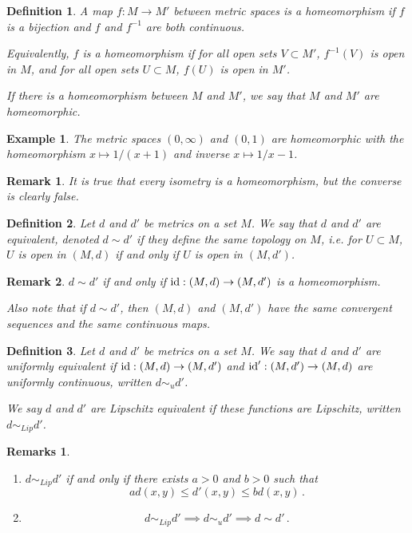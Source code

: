 \documentclass{article}
\theoremstyle{plain}\theoremheaderfont{\normalfont\itshape}\theorembodyfont{\rmfamily}\theoremseparator{.}\newtheorem*{rem}{Remark}\newtheorem*{ex}{Example}\newtheorem*{proof}{Proof}\newtheorem*{altp}{Alternative proof}
\theoremstyle{plain}\theoremheaderfont{\normalfont\bfseries}\theorembodyfont{\rmfamily}\theoremseparator{.}\newtheorem{thm}{Theorem}[section]\newtheorem{lem}[thm]{Lemma}\newtheorem{prop}[thm]{Proposition}\newtheorem*{cor}{Corollary}\newtheorem{defn}[thm]{Definition}\newtheorem{clm}[thm]{Claim}\newtheorem{clminproof}{Claim}
\theoremstyle{break}\theoremheaderfont{\normalfont\itshape}\theorembodyfont{\rmfamily}\theoremseparator{.\medskip}\newtheorem*{proofskip}{Proof}\newtheorem*{exs}{Examples}\newtheorem*{rems}{Remarks}
\theoremstyle{break}\theoremheaderfont{\normalfont\bfseries}\theorembodyfont{\rmfamily}\theoremseparator{.\medskip}\newtheorem{lemskip}[thm]{Lemma}\newtheorem{defnskip}[thm]{Definition}\newtheorem{propskip}[thm]{Proposition}\newtheorem{thmskip}[thm]{Theorem}
\DeclareMathOperator{\id}{id}
\begin{document}
    \begin{defn}
        A map \(f:M\to M'\) between metric spaces is a \textit{homeomorphism} if \(f\) is a bijection and \(f\) and \(f^{-1}\) are both continuous.

        Equivalently, \(f\) is a \textit{homeomorphism} if for all open sets \(V\subset M'\), \(f^{-1}(V)\) is open in \(M\), and for all open sets \(U\subset M\), \(f(U)\) is open in \(M'\).

        If there is a homeomorphism between \(M\) and \(M'\), we say that \(M\) and \(M'\) are \textit{homeomorphic}.
    \end{defn}

    \begin{ex}
        The metric spaces \((0,\infty)\) and \((0,1)\) are homeomorphic with the homeomorphism \(x\mapsto 1/(x+1)\) and inverse \(x\mapsto 1/x -1\).
    \end{ex}
    \begin{rem}
        It is true that every isometry is a homeomorphism, but the converse is clearly false.
    \end{rem}

    \begin{defn}
        Let \(d\) and \(d'\) be metrics on a set \(M\). We say that \(d\) and \(d'\) are \textit{equivalent}, denoted \(d\sim d'\) if they define the same topology on \(M\), i.e. for \(U\subset M\), \(U\) is open in \((M,d)\) if and only if \(U\) is open in \((M,d')\).
    \end{defn}
    \begin{rem}
        \(d\sim d'\) if and only if \(\id:(M,d)\to(M,d')\) is a homeomorphism.

        Also note that if \(d\sim d'\), then \((M,d)\) and \((M,d')\) have the same convergent sequences and the same continuous maps.
    \end{rem}

    \begin{defn}
        Let \(d\) and \(d'\) be metrics on a set \(M\). We say that \(d\) and \(d'\) are \textit{uniformly equivalent} if \(\id:(M,d)\to(M,d')\) and \(\id':(M,d')\to(M,d)\) are uniformly continuous, written \(d\sim_u d'\).

        We say \(d\) and \(d'\) are \textit{Lipschitz equivalent} if these functions are Lipschitz, written \(d\sim_{Lip}d'\).
    \end{defn}
    \begin{rems}
        \begin{enumerate}[label=(\roman*),topsep=0pt]
            \item \(d\sim_{Lip}d'\) if and only if there exists \(a>0\) and \(b>0\) such that
            \[ad(x,y)\le d'(x,y)\le bd(x,y)\,.\]
            \item \[d\sim_{Lip} d'\implies d\sim_u d' \implies d\sim d'\,.\]
        \end{enumerate}
    \end{rems}
    
\end{document}
